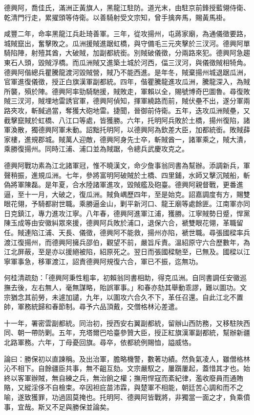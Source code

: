 \begin{pinyinscope}
德興阿，喬佳氏，滿洲正黃旗人，黑龍江駐防。道光末，由駐京前鋒授藍翎侍衛、乾清門行走，累擢頭等侍衛。以善騎射受文宗知，曾手擒奔馬，賜黃馬褂。

咸豐二年，命率黑龍江兵赴琦善軍。三年，從攻揚州，屯蔣家廟，為通儀徵要路，城賊竄出，奮擊敗之。瓜洲援賊進踞虹橋，與守備毛三元夾擊於三汊河。德興阿單騎陷陣，射殪其酋，大破賊，加副都統銜。別賊破儀徵，分兩路來犯。德興阿急趨東石人頭，毀賊浮橋。而瓜洲賊又進築土城於河西，偪三汊河，與儀徵賊相犄角。德興阿偕總兵瞿騰龍渡河毀賊營，賊乃不能西進。是年冬，賊棄揚州城退踞瓜洲，官軍進復儀徵，授正白旗漢軍副都統。四年，偕瞿騰龍進攻瓜洲，騰龍深入，為賊所襲，殞於陣。德興阿率勁騎馳援，賊敗走，軍賴以全，賜號博奇巴圖魯。尋復敗賊三汊河，賊埋地雷誘官軍，德興阿偵知，揮軍繞路而前，賊伏壘不出，遂分軍兩路夾攻，斬馘過當，奪獲大砲地雷。捷聞，晉御前侍衛。五年，迭攻瓜洲賊壘，又截擊竄賊於虹橋、八江口等處，皆獲勝。六年，托明阿兵敗於土橋，揚州復陷，諸軍渙散，獨德興阿軍未動。詔黜托明阿，以德興阿為欽差大臣，加都統銜。敗賊薛家樓，進規郡城。賊萬人迎敵，德興阿身先士卒，斬賊酋一，諸軍乘之，賊大潰，乘勝復揚州。同時江浦、浦口並為賊踞，令總兵武慶攻克之。

德興阿戰功素為江北諸軍冠，惟不曉漢文，命少詹事翁同書為幫辦。添調新兵，軍聲稍振，進規瓜洲。七年，參將富明阿破賊於土橋、四里鋪，水師又擊沉賊船，斬偽將軍陳磊。是年夏，合水陸諸軍進攻，毀賊艦及砲臺。德興阿親督戰，更番進逼，至十一月，大破之，復瓜洲。賊負嵎歷四年，至是始克。詔嘉調度有方，賜雙眼花翎，予騎都尉世職。乘勝逼金山，剿平新河口、龍王廟等處餘匪。江南軍亦同日克鎮江，專力進攻江寧。八年春，德興阿進軍江浦，獲勝。江寧賊勢日蹙，悍黨陳玉成等由安徽糾眾來援，德興阿兵敗於浦口，退保六合，褫雙眼花翎，革職留任。賊連陷江浦、天長、儀徵，德興阿不能救，揚州亦陷，褫世職。尋張國樑率兵渡江復揚州，而德興阿擁兵邵伯，觀望不前，嚴旨斥責。溫紹原守六合歷數年，為江北屏蔽，至是亦以援絕被陷，紹原死之。翌日而張國樑馳至，已無及。國樑以江寧軍事急，移軍渡江，詔責德興阿規復六合，軍已不振，迄無功。

何桂清疏劾：「德興阿秉性粗率，初賴翁同書相助，得克瓜洲。自同書調任安徽巡撫去後，左右無人，毫無謀略，貽誤軍事。」和春亦劾其舉動乖謬，難以圖功。文宗猶念其前勞，未遽加譴，九年，以圍攻六合久不下，革任召還。自此江北不置帥，軍務統歸和春節制。尋予六品頂戴，交僧格林沁差遣。

十一年，署密雲副都統。同治初，授西安右翼副都統，留辦山西防務，又移駐陜西同、朝一帶防剿。五年，充塔爾巴哈臺參贊大臣，授正紅旗漢軍副都統，幫辦新疆北路軍務。六年，丁母憂回旗。尋卒，依都統例賜恤，謚威恪。

論曰：勝保初以直諫稱。及出治軍，膽略機警，數著功績。然負氣凌人，雖僧格林沁不相下。自餘疆臣共事，無不齟互劾。文宗嚴馭之，屢躓屢起，蓋惜其才也。始終以客軍辦賊，無自練之兵，無治餉之權；撫用悍寇而紊紀律，濫收廢員而通賄賂，又縱淫侈不自檢束。卒因袒庇苗沛霖，與楚軍不相能，朝廷苦心調和而不之喻，遂致獲罪，功過固莫掩也。托明阿、德興阿皆戰將，非獨當一面之才，負乘僨事，宜哉。斯又不足與勝保並論矣。


\end{pinyinscope}